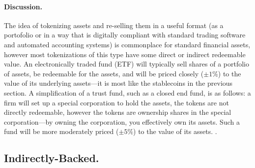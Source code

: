 \paragraph{Discussion.} The idea of tokenizing assets and re-selling them in a useful format (\eg as a portofolio or in a way that is digitally compliant with standard trading software and automated accounting systems) is commonplace for standard financial assets, however most tokenizations of this type have some direct or indirect redeemable value. An electronically traded fund (ETF) will typically sell shares of a portfolio of assets, be redeemable for the assets, and will be priced closely ($\pm 1\%$) to the value of its underlying assets---it is most like the stablecoins in the previous section. A simplification of a trust fund, such as a closed end fund, is as follows: a firm will set up a special corporation to hold the assets, the tokens are not directly redeemable, however the tokens are ownership shares in the special corporation---by owning the corporation, you effectively own its assets. Such a fund will be more moderately priced ($\pm 5\%$) to the value of its assets. .




\subsection{Indirectly-Backed.}



